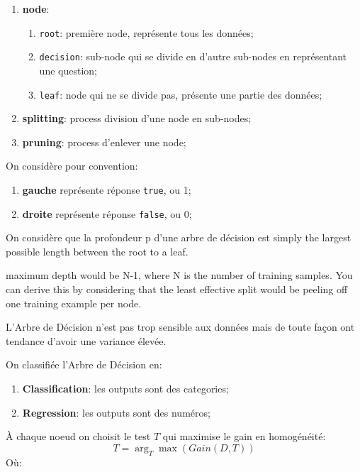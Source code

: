 \documentclass{article}
\begin{document}
\begin{definition}
\begin{enumerate}[noitemsep]
        \item \textbf{node}:
        \begin{enumerate}[noitemsep]
            \item \texttt{root}: première node, représente tous les données;
            \item \texttt{decision}: sub-node qui se divide en d'autre sub-nodes en représentant une question;
            \item \texttt{leaf}: node qui ne se divide pas, présente une partie des données;
        \end{enumerate}
        \item \textbf{splitting}: process division d'une node en sub-nodes;
        \item \textbf{pruning}: process d'enlever une node;
    \end{enumerate}
    On considère pour convention:
    \begin{enumerate}[noitemsep]
        \item \textbf{gauche} représente réponse \texttt{true}, ou 1;
        \item \textbf{droite} représente réponse \texttt{false}, ou 0;
    \end{enumerate}
    On considère que la profondeur p d'une arbre de décision est simply the largest possible length between the root to a leaf.
    \begin{remark}
        maximum depth would be N-1, where N is the number of training samples. You can derive this by considering that the least effective split would be peeling off one training example per node.
    \end{remark}
\end{definition}
\begin{remark}
    L'Arbre de Décision n'est pas trop sensible aux données mais de toute façon ont tendance d'avoir une variance élevée. 
\end{remark}
On classifiée l'Arbre de Décision en:
\begin{enumerate}[noitemsep]
    \item \textbf{Classification}: les outputs sont des categories;
    \item \textbf{Regression}: les outputs sont des numéros;
\end{enumerate}
À chaque noeud on choisit le test $T$ qui maximise le gain en homogénéité:
\begin{equation}
    T = \arg_{T}\max(Gain(D, T))
\end{equation}
Où:
\end{document}
